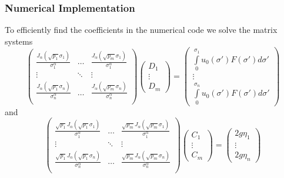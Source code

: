 	
		\begin{frame}
		\frametitle{Numerical Implementation}
		To efficiently find the coefficients in the numerical code we solve the matrix systems
		\[
		\begin{pmatrix}
		\frac{J_\alpha(\sqrt{p_1}\sigma_1)}{\sigma_1^\alpha}&\ldots &\frac{J_\alpha(\sqrt{p_m}\sigma_1)}{\sigma_1^\alpha}\\
		\vdots&\ddots&\vdots\\
		\frac{J_\alpha(\sqrt{p_1}\sigma_n)}{\sigma_n^\alpha}&\ldots&\frac{J_\alpha(\sqrt{p_m}\sigma_n)}{\sigma_n^\alpha}\\
		\end{pmatrix}\begin{pmatrix}D_1\\\vdots\\D_m\end{pmatrix}=\begin{pmatrix} \int\limits_0^{\sigma_1} u_0(\sigma ')F(\sigma ')d \sigma'\\\vdots \\\int\limits_0^{\sigma_n} u_0(\sigma ')F(\sigma ')d \sigma' \end{pmatrix}
		\]
		and
				\[
		\begin{pmatrix}
		\frac{\sqrt{p_1}J_\alpha(\sqrt{p_1}\sigma_1)}{\sigma_1^\alpha}&\ldots &\frac{\sqrt{p_m}J_\alpha(\sqrt{p_m}\sigma_1)}{\sigma_1^\alpha}\\
		\vdots&\ddots&\vdots\\
		\frac{\sqrt{p_1}J_\alpha(\sqrt{p_1}\sigma_n)}{\sigma_n^\alpha}&\ldots&\frac{\sqrt{p_m}J_\alpha(\sqrt{p_m}\sigma_n)}{\sigma_n^\alpha}\\
		\end{pmatrix}\begin{pmatrix}C_1\\\vdots\\C_m\end{pmatrix}=\begin{pmatrix} 2g\eta_1\\\vdots \\2g\eta_n\end{pmatrix}
		\]
	\end{frame}
	
	
	
	
	
	
	
	
	
	
	
	
	
	
	
	
	
	
	
	
	
	
